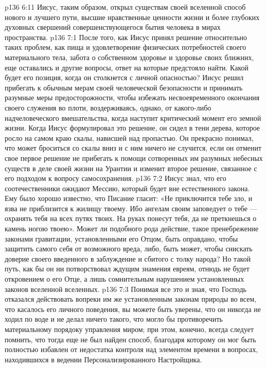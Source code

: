 \vs p136 6:11 Иисус, таким образом, открыл существам своей вселенной способ нового и лучшего пути, высшие нравственные ценности жизни и более глубоких духовных свершений совершенствующегося бытия человека в мирах пространства.
\vs p136 7:1 После того, как Иисус принял решение относительно таких проблем, как пища и удовлетворение физических потребностей своего материального тела, забота о собственном здоровье и здоровье своих ближних, еще оставались и другие вопросы, ответ на которые предстояло найти. Какой будет его позиция, когда он столкнется с личной опасностью? Иисус решил прибегать к обычным мерам своей человеческой безопасности и принимать разумные меры предосторожности, чтобы избежать несвоевременного окончания своего служения во плоти, воздерживаясь, однако, от какого\hyp{}либо надчеловеческого вмешательства, когда наступит критический момент его земной жизни. Когда Иисус формулировал это решение, он сидел в тени дерева, которое росло на самом краю скалы, нависшей над пропастью. Он прекрасно понимал, что может броситься со скалы вниз и с ним ничего не случится, если он отменит свое первое решение не прибегать к помощи сотворенных им разумных небесных существ в деле своей жизни на Урантии и изменит второе решение, связанное с его подходом к вопросу самосохранения.
\vs p136 7:2 Иисус знал, что его соотечественники ожидают Мессию, который будет вне естественного закона. Ему было хорошо известно, что Писание гласит: «Не приключится тебе зло, и язва не приблизится к жилищу твоему. Ибо ангелам своим заповедует о тебе --- охранять тебя на всех путях твоих. На руках понесут тебя, да не преткнешься о камень ногою твоею». Может ли подобного рода действие, такое пренебрежение законами гравитации, установленными его Отцом, быть оправдано, чтобы защитить самого себя от возможного вреда, либо, быть может, чтобы снискать доверие своего введенного в заблуждение и сбитого с толку народа? Но такой путь, как бы он ни потворствовал ждущим знамения евреям, отнюдь не будет откровением о его Отце, а лишь сомнительным нарушением установленных законов вселенной вселенных.
\vs p136 7:3 \pc Понимая все это и зная, что Господь отказался действовать вопреки им же установленным законам природы во всем, что касалось его личного поведения, вы можете быть уверены, что он никогда не ходил по воде и не делал ничего такого, что могло бы противоречить материальному порядоку управления миром; при этом, конечно, всегда следует помнить, что тогда еще не был найден способ, благодаря которому он мог быть полностью избавлен от недостатка контроля над элементом времени в вопросах, находившихся в ведении Персонализированного Настройщика.

